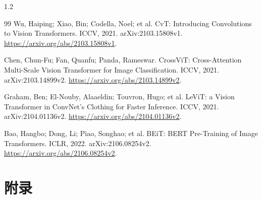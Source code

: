 \documentclass[UTF8,a4paper,zihao=-4,fontset=fandol]{ctexart}
\begin{document}
\begin{spacing}{1.2}
\begin{thebibliography}{99}
 Wu, Haiping; Xiao, Bin; Codella, Noel; et al. CvT: Introducing Convolutions to Vision Transformers. ICCV, 2021. arXiv:2103.15808v1. \url{https://arxiv.org/abs/2103.15808v1}.

 Chen, Chun-Fu; Fan, Quanfu; Panda, Rameswar. CrossViT: Cross-Attention Multi-Scale Vision Transformer for Image Classification. ICCV, 2021. arXiv:2103.14899v2. \url{https://arxiv.org/abs/2103.14899v2}.

 Graham, Ben; El-Nouby, Alaaeldin; Touvron, Hugo; et al. LeViT: a Vision Transformer in ConvNet's Clothing for Faster Inference. ICCV, 2021. arXiv:2104.01136v2. \url{https://arxiv.org/abs/2104.01136v2}.

 Bao, Hangbo; Dong, Li; Piao, Songhao; et al. BEiT: BERT Pre-Training of Image Transformers. ICLR, 2022. arXiv:2106.08254v2. \url{https://arxiv.org/abs/2106.08254v2}.
\end{thebibliography}\end{spacing}

\clearpage\section{附录}
\end{document}
